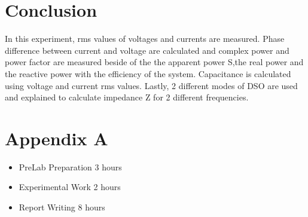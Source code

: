 \documentclass[letterpaper,12pt]{article}
\begin{document}
\section{Conclusion}
In this experiment, rms values of voltages and currents are measured. Phase difference between current and voltage are calculated and complex power and power factor are measured beside of the the apparent power S,the real power and the reactive power with the efficiency of the system. Capacitance is calculated using voltage and current rms values. Lastly, 2 different modes of DSO are used and explained to calculate impedance Z for 2 different frequencies.


\section*{Appendix A}
\begin{itemize}
    \item PreLab Preparation 3 hours
    \item Experimental Work 2  hours
    \item Report Writing 8 hours
\end{itemize}
\end{document}
